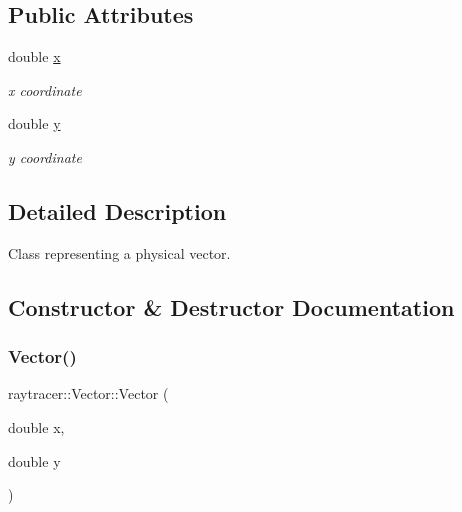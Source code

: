 \subsection*{Public Attributes}
\begin{DoxyCompactItemize}
\item 
\mbox{\label{classraytracer_1_1Vector_a14aa5241f6abb01266ea77586fa1437a}} 
double \hyperlink{classraytracer_1_1Vector_a14aa5241f6abb01266ea77586fa1437a}{x}
\begin{DoxyCompactList}\small\item\em x coordinate \end{DoxyCompactList}\item 
\mbox{\label{classraytracer_1_1Vector_ad4d58fd3af1dbf59eae8c55a67e85b3a}} 
double \hyperlink{classraytracer_1_1Vector_ad4d58fd3af1dbf59eae8c55a67e85b3a}{y}
\begin{DoxyCompactList}\small\item\em y coordinate \end{DoxyCompactList}\end{DoxyCompactItemize}


\subsection{Detailed Description}
Class representing a physical vector. 

\subsection{Constructor \& Destructor Documentation}
\mbox{\label{classraytracer_1_1Vector_a4a257f16b43edb428655be54c640fb69}} 
\subsubsection{\texorpdfstring{Vector()}{Vector()}}
{\footnotesize\ttfamily raytracer\+::\+Vector\+::\+Vector (\begin{DoxyParamCaption}\item[{double}]{x,  }\item[{double}]{y }\end{DoxyParamCaption})}



